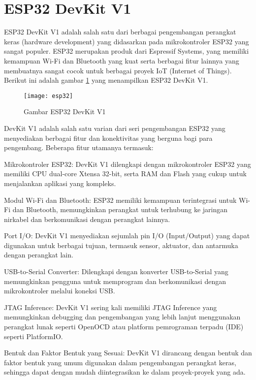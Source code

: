 \section{ESP32 DevKit V1}
ESP32 DevKit V1 adalah salah satu dari berbagai pengembangan perangkat keras (hardware development) yang didasarkan pada mikrokontroler ESP32 yang sangat populer. ESP32 merupakan produk dari Espressif Systems, yang memiliki kemampuan Wi-Fi dan Bluetooth yang kuat serta berbagai fitur lainnya yang membuatnya sangat cocok untuk berbagai proyek IoT (Internet of Things). Berikut ini adalah gambar \cref{fig:ESP} yang menampilkan ESP32 DevKit V1.

\begin{figure}[H]
	\centering
	\texttt{[image: esp32]}
	\caption{Gambar ESP32 DevKit V1}
	\label{fig:ESP}
\end{figure}

DevKit V1 adalah salah satu varian dari seri pengembangan ESP32 yang menyediakan berbagai fitur dan konektivitas yang berguna bagi para pengembang. Beberapa fitur utamanya termasuk:
\begin{packed_item}
	\item Mikrokontroler ESP32: DevKit V1 dilengkapi dengan mikrokontroler ESP32 yang memiliki CPU dual-core Xtensa 32-bit, serta RAM dan Flash yang cukup untuk menjalankan aplikasi yang kompleks.
	\item Modul Wi-Fi dan Bluetooth: ESP32 memiliki kemampuan terintegrasi untuk Wi-Fi dan Bluetooth, memungkinkan perangkat untuk terhubung ke jaringan nirkabel dan berkomunikasi dengan perangkat lainnya.
	\item Port I/O: DevKit V1 menyediakan sejumlah pin I/O (Input/Output) yang dapat digunakan untuk berbagai tujuan, termasuk sensor, aktuator, dan antarmuka dengan perangkat lain.
	\item USB-to-Serial Converter: Dilengkapi dengan konverter USB-to-Serial yang memungkinkan pengguna untuk memprogram dan berkomunikasi dengan mikrokontroler melalui koneksi USB.
	\item JTAG Inference: DevKit V1 sering kali memiliki  JTAG Inference yang memungkinkan debugging dan pengembangan yang lebih lanjut menggunakan perangkat lunak seperti OpenOCD atau platform pemrograman terpadu (IDE) seperti PlatformIO.
	\item Bentuk dan Faktor Bentuk yang Sesuai: DevKit V1 dirancang dengan bentuk dan faktor bentuk yang umum digunakan dalam pengembangan perangkat keras, sehingga dapat dengan mudah diintegrasikan ke dalam proyek-proyek yang ada.
\end{packed_item}

